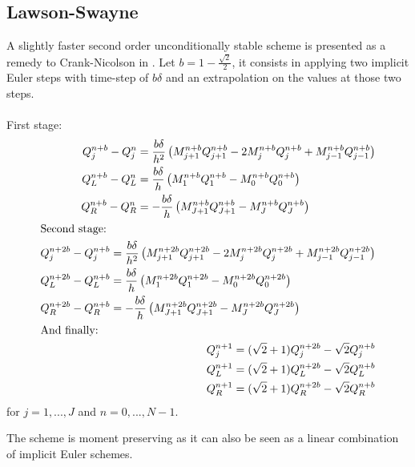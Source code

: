 \documentclass[]{rAMF2e}
\begin{document}
\subsection{Lawson-Swayne}
A slightly faster second order unconditionally stable scheme is presented as a remedy to Crank-Nicolson in \citep{lawson1976simple, lawson1978extrapolation}. Let $b=1-\frac{\sqrt{2}}{2}$, it consists in applying two implicit Euler steps with time-step of $b\delta$ and an extrapolation on the values at those two steps.\\
\\
First stage:
\begin{align}\label{eqn_lawson_swayne}
\begin{split}
Q_j^{n+b}-Q_j^n &= \frac{b\delta}{h^2} \left(M_{j+1}^{n+b}Q_{j+1}^{n+b}-2M_j^{n+b}Q_j^{n+b}+M_{j-1}^{n+b}Q_{j-1}^{n+b} \right) \\
Q_L^{n+b}-Q_L^n &= \frac{b\delta}{h} \left(M_{1}^{n+b}Q_{1}^{n+b}-M_0^{n+b}Q_0^{n+b}\right) \\
Q_R^{n+b}-Q_R^n &= -\frac{b\delta}{h} \left(M_{J+1}^{n+b}Q_{J+1}^{n+b}-M_J^{n+b}Q_J^{n+b}\right)
\end{split}\\
\intertext{Second stage:}
\begin{split}
Q_j^{n+2b}-Q_j^{n+b} &= \frac{b\delta}{h^2} \left(M_{j+1}^{n+2b}Q_{j+1}^{n+2b}-2M_j^{n+2b}Q_j^{n+2b}+M_{j-1}^{n+2b}Q_{j-1}^{n+2b} \right) \\
Q_L^{n+2b}-Q_L^{n+b} &= \frac{b\delta}{h} \left(M_{1}^{n+2b}Q_{1}^{n+2b}-M_0^{n+2b}Q_0^{n+2b}\right) \\
Q_R^{n+2b}-Q_R^{n+b} &= -\frac{b\delta}{h} \left(M_{J+1}^{n+2b}Q_{J+1}^{n+2b}-M_J^{n+2b}Q_J^{n+2b}\right)
\end{split}\\
\intertext{And finally:}
\begin{split}
Q_j^{n+1} &= (\sqrt{2}+1) Q_j^{n+2b} - \sqrt{2}Q_j^{n+b}\\
Q_L^{n+1} &= (\sqrt{2}+1) Q_L^{n+2b} - \sqrt{2} Q_L^{n+b}\\
Q_R^{n+1} &= (\sqrt{2}+1)  Q_R^{n+2b} - \sqrt{2} Q_R^{n+b}
\end{split}
\end{align}
for $j=1,...,J$ and $n=0,...,N-1$.

The scheme is moment preserving as it can also be seen as a linear combination of implicit Euler schemes.
\end{document}
